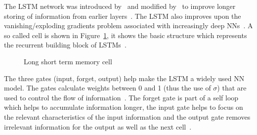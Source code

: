 The \ac{LSTM} network was introduced by~\cite{hochreiter_long_1997} and modified
by~\cite{gers_learning_1999} to improve longer storing of information from earlier
layers~\citep{chauhan_review_2018}.
The \ac{LSTM} also improves upon the vanishing/exploding gradients problem associated with
increasingly deep \acp{NN}~\citep{sherstinsky_fundamentals_2020}.
A so called cell is shown in Figure~\ref{fig:lstm}, it shows the basic structure which represents
the recurrent building block of \acp{LSTM}~\citep{goodfellow_deep_2016}.
\begin{figure}[ht]
    \centering
    
    \caption[Long short term memoory cell]{%
        Long short term memory cell~\citep{goodfellow_deep_2016,yu_review_2019}\label{fig:lstm}
    }
\end{figure}
The three gates (input, forget, output) help make the \ac{LSTM} a widely used \ac{NN} model.
The gates calculate weights between 0 and 1 (thus the use of $\sigma$) that are used to control
the flow of information~\citep{goodfellow_deep_2016}.
The forget gate is part of a self loop which helps to accumulate information longer, the input
gate helps to focus on the relevant characteristics of the input information
and the output gate removes irrelevant information for the output as well as the next
cell~\citep{goodfellow_deep_2016}.

